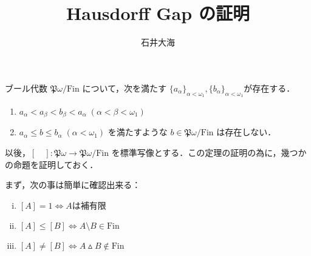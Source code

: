 \documentclass[a4j,uplatex]{jsarticle}
\title{Hausdorff Gap の証明}
\author{石井大海}
\newcommand{\Fin}{\mathrm{Fin}}
\begin{document}
\maketitle

\begin{theorem}[Hausdorff]
 ブール代数 $\mathfrak{P}\omega / \Fin$ について，次を満たす $\{a_\alpha\}_{\alpha < \omega_1}, \{b_\alpha\}_{\alpha < \omega_1}$が存在する．
 \begin{enumerate}
  \item $a_\alpha < a_\beta < b_\beta < a_\alpha\; (\alpha < \beta < \omega_1)$
  \item $a_\alpha \leq b \leq b_\alpha \; (\alpha < \omega_1)$ を満たすような $b \in \mathfrak{P}\omega / \Fin$ は存在しない．
 \end{enumerate}
\end{theorem}

以後，$[\quad]: \mathfrak{P}\omega \to \mathfrak{P}\omega/\Fin$ を標準写像とする．この定理の証明の為に，幾つかの命題を証明しておく．

まず，次の事は簡単に確認出来る：

\begin{fact}
 \begin{enumerate}[(i)]
  \item $[A] = 1 \Leftrightarrow A \text{は補有限}$
  \item $[A] \leq [B] \Leftrightarrow A \setminus B \in \Fin$
  \item $[A] \neq [B] \Leftrightarrow A \vartriangle B \notin \Fin$
 \end{enumerate}
\end{fact}
\end{document}
